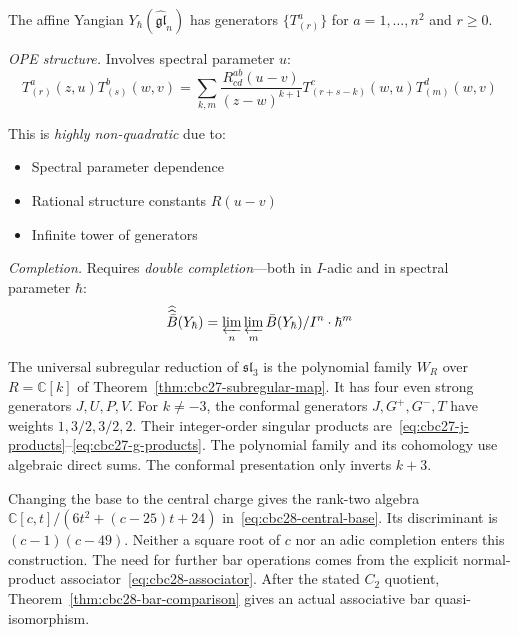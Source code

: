 \begin{example}\label{ex:affine-yangian-kp}
\label{ex:yangian-completion}

The affine Yangian $Y_\hbar(\widehat{\mathfrak{gl}}_n)$ has generators $\{T^a_{(r)}\}$ for $a = 1, \ldots, n^2$ and $r \geq 0$.

\emph{OPE structure.} Involves spectral parameter $u$:
\[T^a_{(r)}(z, u) T^b_{(s)}(w, v) = \sum_{k,m} \frac{R^{ab}_{cd}(u-v)}{(z-w)^{k+1}} T^c_{(r+s-k)}(w,u) T^d_{(m)}(w,v)\]

This is \emph{highly non-quadratic} due to:
\begin{itemize}
\item Spectral parameter dependence
\item Rational structure constants $R(u-v)$
\item Infinite tower of generators
\end{itemize}

\emph{Completion.} Requires \emph{double completion}---both in $I$-adic and in spectral parameter $\hbar$:
\[\widehat{\widehat{\bar{B}}}(Y_\hbar) = \varprojlim_n \varprojlim_m \bar{B}(Y_\hbar)/I^n \cdot \hbar^m\]
\end{example}

\begin{example}
\label{ex:bp-algebra}
The universal subregular reduction of $\mathfrak{sl}_3$ is the polynomial family
$W_R$ over $R=\mathbb C[k]$ of Theorem~\ref{thm:cbc27-subregular-map}.
It has four even strong generators $J,U,P,V$.
For $k\ne-3$, the conformal generators $J,G^+,G^-,T$ have weights $1,3/2,3/2,2$.
Their integer-order singular products are~\eqref{eq:cbc27-j-products}--\eqref{eq:cbc27-g-products}.
The polynomial family and its cohomology use algebraic direct sums.
The conformal presentation only inverts $k+3$.

Changing the base to the central charge gives the rank-two algebra
$\mathbb C[c,t]/(6t^2+(c-25)t+24)$ in~\eqref{eq:cbc28-central-base}.
Its discriminant is $(c-1)(c-49)$.
Neither a square root of $c$ nor an adic completion enters this construction.
The need for further bar operations comes from the explicit normal-product associator~\eqref{eq:cbc28-associator}.
After the stated $C_2$ quotient, Theorem~\ref{thm:cbc28-bar-comparison} gives an actual associative bar quasi-isomorphism.
\end{example}

